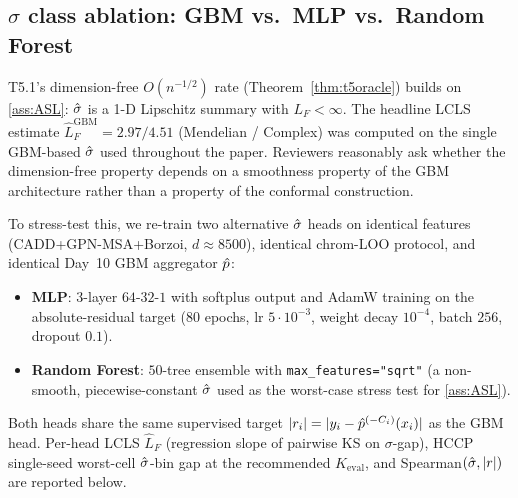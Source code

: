 \subsection{$\hat\sigma$ class ablation: GBM vs.\ MLP vs.\ Random Forest}
\label{app:tables:sigma_ablation}

T5.1's dimension-free $O(n^{-1/2})$ rate (Theorem~\ref{thm:t5oracle})
builds on \ref{ass:ASL}: $\hat{\sigma}$ is a 1-D Lipschitz summary with
$L_F < \infty$. The headline LCLS estimate $\hat L_F^{\mathrm{GBM}} = 2.97 / 4.51$
(Mendelian / Complex) was computed on the single GBM-based $\hat{\sigma}$ used
throughout the paper. Reviewers reasonably ask whether the dimension-free
property depends on a smoothness property of the GBM architecture rather
than a property of the conformal construction.

To stress-test this, we re-train two alternative $\hat{\sigma}$ heads on identical
features (CADD+GPN-MSA+Borzoi, $d \approx 8500$), identical chrom-LOO
protocol, and identical Day~10 GBM aggregator $\hat{p}$:
\begin{itemize}
\item \textbf{MLP}: 3-layer $64\text{-}32\text{-}1$ with softplus output and
AdamW training on the absolute-residual target ($80$ epochs, lr $5{\cdot}10^{-3}$,
weight decay $10^{-4}$, batch $256$, dropout $0.1$).
\item \textbf{Random Forest}: $50$-tree ensemble with
\texttt{max\_features="sqrt"} (a non-smooth, piecewise-constant $\hat{\sigma}$ used
as the worst-case stress test for \ref{ass:ASL}).
\end{itemize}
Both heads share the same supervised target $|r_i| = |y_i - \hat{p}^{(-C_i)}(x_i)|$
as the GBM head. Per-head LCLS $\hat L_F$ (regression slope of pairwise KS
on $\sigma$-gap), HCCP single-seed worst-cell $\hat{\sigma}$-bin gap at the
recommended $K_{\mathrm{eval}}$, and Spearman$(\hat{\sigma}, |r|)$ are reported below.

